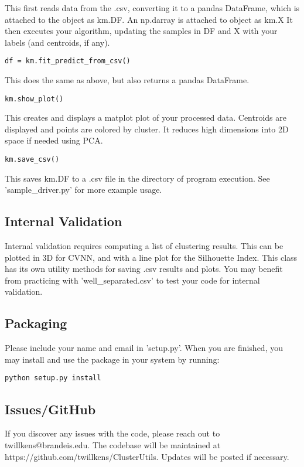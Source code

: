 \documentclass[12pt]{article}
\begin{document}
This first reads data from the .csv, converting it to a pandas DataFrame, which is attached to the object as km.DF. 
An np.darray is attached to object as km.X
It then executes your algorithm, updating the samples in DF and X with your labels (and centroids, if any).

\begin{lstlisting}
df = km.fit_predict_from_csv()
\end{lstlisting}

This does the same as above, but also returns a pandas DataFrame.

\begin{lstlisting}
km.show_plot()
\end{lstlisting}

This creates and displays a matplot plot of your processed data. Centroids are displayed and points are colored by cluster. It reduces high dimensions into 2D space if needed using PCA.

\begin{lstlisting}
km.save_csv()
\end{lstlisting}

This saves km.DF to a .csv file in the directory of program execution. See 'sample\_driver.py' for more example usage.

\subsection*{Internal Validation}
Internal validation requires computing a list of clustering results. This can be plotted in 3D for CVNN, and with a line plot for the Silhouette Index. This class has its own utility methods for saving .csv results and plots. You may benefit from practicing with 'well\_separated.csv' to test your code for internal validation.

\subsection*{Packaging}
Please include your name and email in 'setup.py'. When you are finished, you may install and use the package in your system by running:
\begin{lstlisting}
python setup.py install
\end{lstlisting}

\subsection*{Issues/GitHub}
If you discover any issues with the code, please reach out to twillkens@brandeis.edu. The codebase will be maintained at https://github.com/twillkens/ClusterUtils. Updates will be posted if necessary.
\end{document}
